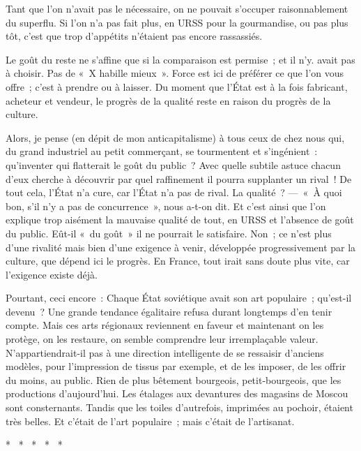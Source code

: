 \documentclass[french,twoside]{book} %
\begin{document}
\noindent Tant que l’on n’avait pas le nécessaire, on ne pouvait s’occuper raisonnablement du superflu. Si l’on n’a pas fait plus, en URSS pour la gourmandise, ou pas plus tôt, c’est que trop d’appétits n’étaient pas encore rassassiés.\par
Le goût du reste ne s’affine que si la comparaison est permise ; et il n’y. avait pas à choisir. Pas de « X habille mieux ». Force est ici de préférer ce que l’on vous offre ; c’est à prendre ou à laisser. Du moment que l’État est à la fois fabricant, acheteur et vendeur, le progrès de la qualité reste en raison du progrès de la culture.\par
Alors, je pense (en dépit de mon anticapitalisme) à tous ceux de chez nous qui, du grand industriel au petit commerçant, se tourmentent et s’ingénient : qu’inventer qui flatterait le goût du public ? Avec quelle subtile astuce chacun d’eux cherche à découvrir par quel raffinement il pourra supplanter un rival ! De tout cela, l’État n’a cure, car l’État n’a pas de rival. La qualité ? — « À quoi bon, s’il n’y a pas de concurrence », nous a-t-on dit. Et c’est ainsi que l’on explique trop aisément la mauvaise qualité de tout, en URSS et l’absence de goût du public. Eût-il « du goût » il ne pourrait le satisfaire. Non ; ce n’est plus d’une rivalité mais bien d’une exigence à venir, développée progressivement par la culture, que dépend ici le progrès. En France, tout irait sans doute plus vite, car l’exigence existe déjà.\par
Pourtant, ceci encore : Chaque État soviétique avait son art populaire ; qu’est-il devenu ? Une grande tendance égalitaire refusa durant longtemps d’en tenir compte. Mais ces arts régionaux reviennent en faveur et maintenant on les protège, on les restaure, on semble comprendre leur irremplaçable valeur. N’appartiendrait-il pas à une direction intelligente de se ressaisir d’anciens modèles, pour l’impression de tissus par exemple, et de les imposer, de les offrir du moins, au public. Rien de plus bêtement bourgeois, petit-bourgeois, que les productions d’aujourd’hui. Les étalages aux devantures des magasins de Moscou sont consternants. Tandis que les toiles d’autrefois, imprimées au pochoir, étaient très belles. Et c’était de l’art populaire ; mais c’était de l’artisanat.\par

\begin{center}
\noindent \centerline{*  *  *  *  *}\par
\end{center}
\end{document}
